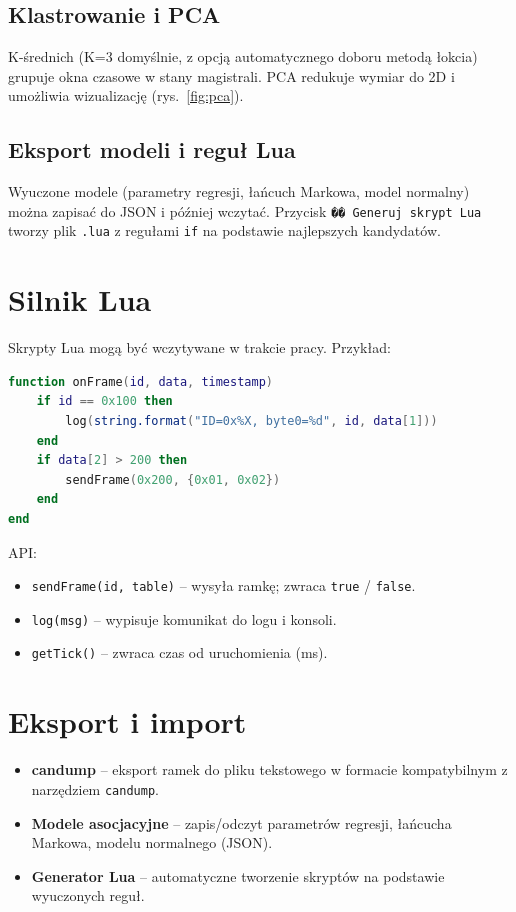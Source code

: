 \documentclass[a4paper,12pt,polish]{article}
\begin{document}
\subsection{Klastrowanie i PCA}
K-średnich (K=3 domyślnie, z opcją automatycznego doboru metodą łokcia) grupuje okna czasowe w stany magistrali. PCA redukuje wymiar do 2D i umożliwia wizualizację (rys.~\ref{fig:pca}).

\subsection{Eksport modeli i reguł Lua}
Wyuczone modele (parametry regresji, łańcuch Markowa, model normalny) można zapisać do JSON i później wczytać. Przycisk \texttt{�� Generuj skrypt Lua} tworzy plik \texttt{.lua} z regułami \texttt{if} na podstawie najlepszych kandydatów.

\section{Silnik Lua}
\label{sec:lua}
Skrypty Lua mogą być wczytywane w trakcie pracy. Przykład:

\begin{lstlisting}[language=lua, caption={example.lua}]
function onFrame(id, data, timestamp)
    if id == 0x100 then
        log(string.format("ID=0x%X, byte0=%d", id, data[1]))
    end
    if data[2] > 200 then
        sendFrame(0x200, {0x01, 0x02})
    end
end
\end{lstlisting}

API:
\begin{itemize}[noitemsep]
  \item \texttt{sendFrame(id, table)} – wysyła ramkę; zwraca \texttt{true} / \texttt{false}.
  \item \texttt{log(msg)} – wypisuje komunikat do logu i konsoli.
  \item \texttt{getTick()} – zwraca czas od uruchomienia (ms).
\end{itemize}

\section{Eksport i import}
\label{sec:export}
\begin{itemize}[noitemsep]
  \item \textbf{candump} – eksport ramek do pliku tekstowego w formacie kompatybilnym z narzędziem \texttt{candump}.
  \item \textbf{Modele asocjacyjne} – zapis/odczyt parametrów regresji, łańcucha Markowa, modelu normalnego (JSON).
  \item \textbf{Generator Lua} – automatyczne tworzenie skryptów na podstawie wyuczonych reguł.
\end{itemize}
\end{document}
